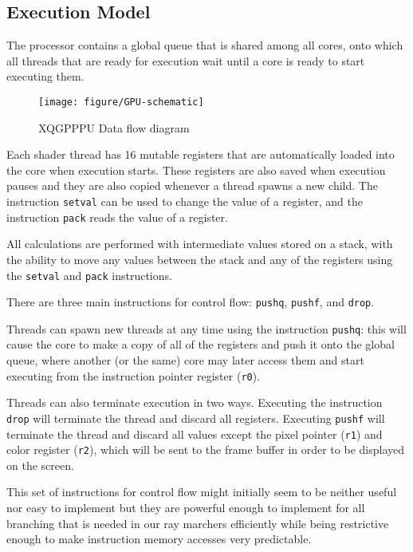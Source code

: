 		\subsection{Execution Model}

			The processor contains a global queue that is shared among all
			cores, onto which all threads that are ready for execution wait
			until a core is ready to start executing them.

			\begin{figure}[H]
				\centering
				\caption{ XQGPPPU Data flow diagram }
					\texttt{[image: figure/GPU-schematic]} 
				\vspace{-4pt}
			\end{figure}
	
			Each shader thread has 16 mutable registers that are automatically
			loaded into the core when execution starts. These registers are
			also saved when execution pauses and they are also copied whenever
			a thread spawns a new child. The instruction \texttt{setval} can be
			used to change the value of a register, and the instruction
			\texttt{pack} reads the value of a register.

			All calculations are performed with intermediate values stored on a
			stack, with the ability to move any values between the stack and
			any of the registers using the \texttt{setval} and \texttt{pack}
			instructions.

			There are three main instructions for control flow: \texttt{pushq},
			\texttt{pushf}, and \texttt{drop}. 

			Threads can spawn new threads at any time using the instruction
			\texttt{pushq}: this will cause the core to make a copy of all of
			the registers and push it onto the global queue, where another (or
			the same) core may later access them and start executing from the
			instruction pointer register (\texttt{r0}).

			Threads can also terminate execution in two ways. Executing the
			instruction \texttt{drop} will terminate the thread and discard all
			registers. Executing \texttt{pushf} will terminate the thread and
			discard all values except the pixel pointer (\texttt{r1}) and color
			register (\texttt{r2}), which will be sent to the frame buffer in
			order to be displayed on the screen.

			This set of instructions for control flow might initially seem to
			be neither useful nor easy to implement but they are powerful
			enough to implement for all branching that is needed in our ray
			marchers efficiently while being restrictive enough to make
			instruction memory accesses very predictable.


